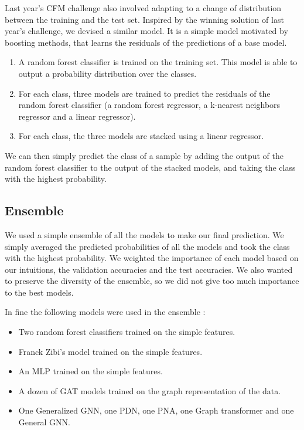 \documentclass[switch, 11pt]{article}
\begin{document}
\begin{multicols}{2}
    Last year's CFM challenge also involved adapting to a change of distribution between the training and the test set. Inspired by the winning solution of last year's challenge, we devised a similar model. It is a simple model motivated by boosting methods, that learns the residuals of the predictions of a base model.
    \begin{enumerate}
        \item A random forest classifier is trained on the training set. This model is able to output a probability distribution over the classes.
        \item For each class, three models are trained to predict the residuals of the random forest classifier (a random forest regressor, a k-nearest neighbors regressor and a linear regressor).
        \item For each class, the three models are stacked using a linear regressor.
    \end{enumerate}

    We can then simply predict the class of a sample by adding the output of the random forest classifier to the output of the stacked models, and taking the class with the highest probability.

    \subsection{Ensemble}

    We used a simple ensemble of all the models to make our final prediction. We simply averaged the predicted probabilities of all the models and took the class with the highest probability. We weighted the importance of each model based on our intuitions, the validation accuracies and the test accuracies. We also wanted to preserve the diversity of the ensemble, so we did not give too much importance to the best models.

    In fine the following models were used in the ensemble :
    \begin{itemize}
        \item Two random forest classifiers trained on the simple features.
        \item Franck Zibi's model trained on the simple features.
        \item An MLP trained on the simple features.
        \item A dozen of GAT models trained on the graph representation of the data.
        \item One Generalized GNN, one PDN, one PNA, one Graph transformer and one General GNN.
    \end{itemize}


\end{multicols}
\end{document}
